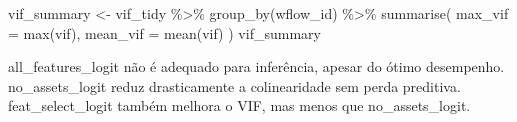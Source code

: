 \documentclass[
  letterpaper,
  DIV=11,
  numbers=noendperiod]{scrartcl}
\newenvironment{Shaded}{\begin{snugshade}}{\end{snugshade}}
\newcommand{\AttributeTok}[1]{\textcolor[rgb]{0.40,0.45,0.13}{#1}}
\newcommand{\ControlFlowTok}[1]{\textcolor[rgb]{0.00,0.23,0.31}{\textbf{#1}}}
\newcommand{\DecValTok}[1]{\textcolor[rgb]{0.68,0.00,0.00}{#1}}
\newcommand{\FunctionTok}[1]{\textcolor[rgb]{0.28,0.35,0.67}{#1}}
\newcommand{\NormalTok}[1]{\textcolor[rgb]{0.00,0.23,0.31}{#1}}
\newcommand{\OtherTok}[1]{\textcolor[rgb]{0.00,0.23,0.31}{#1}}
\newcommand{\SpecialCharTok}[1]{\textcolor[rgb]{0.37,0.37,0.37}{#1}}
\newcommand{\StringTok}[1]{\textcolor[rgb]{0.13,0.47,0.30}{#1}}
\begin{document}
\begin{Shaded}
\begin{Highlighting}[]
\NormalTok{vif\_summary }\OtherTok{\textless{}{-}}\NormalTok{ vif\_tidy }\SpecialCharTok{\%\textgreater{}\%}
  \FunctionTok{group\_by}\NormalTok{(wflow\_id) }\SpecialCharTok{\%\textgreater{}\%}
  \FunctionTok{summarise}\NormalTok{(}
    \AttributeTok{max\_vif =} \FunctionTok{max}\NormalTok{(vif),}
    \AttributeTok{mean\_vif =} \FunctionTok{mean}\NormalTok{(vif)}
\NormalTok{  )}
\NormalTok{vif\_summary}
\end{Highlighting}
\end{Shaded}

\begin{Shaded}
\end{Shaded}

\begin{Shaded}
\end{Shaded}

all\_features\_logit não é adequado para inferência, apesar do ótimo
desempenho. no\_assets\_logit reduz drasticamente a colinearidade sem
perda preditiva. feat\_select\_logit também melhora o VIF, mas menos que
no\_assets\_logit.
\end{document}
